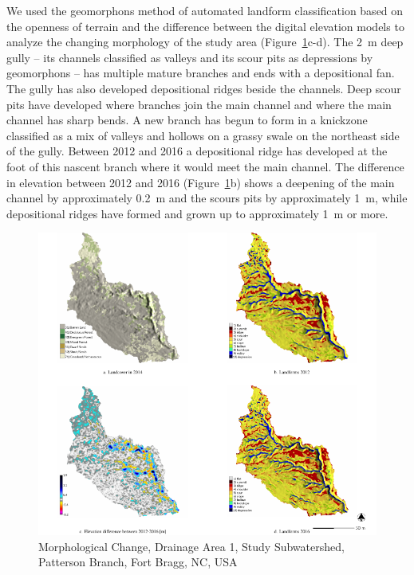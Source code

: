 \documentclass[gmd, manuscript]{copernicus}
\begin{document}
We used the geomorphons method 
of automated landform classification
based on the openness of terrain \citep{Jasiewicz2013}
and the difference between the digital elevation models 
to analyze the changing morphology of the study area
(Figure~\ref{fig:study_area}c-d). 
%
The 2~\unit{m} deep gully -- 
its channels classified as valleys and 
its scour pits as depressions by geomorphons -- 
has multiple mature branches
and ends with a depositional fan.
%
The gully has also developed 
depositional ridges beside the channels.
Deep scour pits have developed 
where branches join the main channel 
and where the main channel has sharp bends.
%
A new branch has begun to form 
in a knickzone classified as a mix of valleys and hollows
on a grassy swale on the northeast side of the gully.
Between 2012 and 2016 a depositional ridge
has developed at the foot of this nascent branch
where it would meet the main channel. 
%
The difference in elevation between 2012 and 2016
(Figure~\ref{fig:study_area}b)
shows a deepening of the main channel 
by approximately 0.2~\unit{m} 
and the scours pits
by approximately 1~\unit{m},
while depositional ridges have formed and grown up to
approximately 1~\unit{m} or more.

\begin{figure}
\center
\includegraphics[width=\textwidth,height=0.95\textheight,keepaspectratio]{figures/study_area.pdf}
\caption{Morphological Change, Drainage Area 1, Study Subwatershed, Patterson Branch, Fort Bragg, NC, USA}
\label{fig:study_area}
\end{figure}
\end{document}
